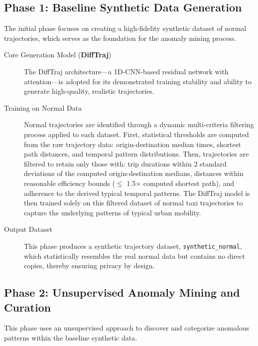 \subsection{Phase 1: Baseline Synthetic Data Generation}
\label{sec:baseline-generation}

The initial phase focuses on creating a high-fidelity synthetic dataset of normal trajectories, which serves as the foundation for the anomaly mining process.

\begin{description}
  \item[Core Generation Model (\textbf{DiffTraj})] The DiffTraj architecture---a 1D-CNN-based residual network with attention---is adopted for its demonstrated training stability and ability to generate high-quality, realistic trajectories.
  \item[Training on Normal Data] Normal trajectories are identified through a dynamic multi-criteria filtering process applied to each dataset. First, statistical thresholds are computed from the raw trajectory data: origin-destination median times, shortest path distances, and temporal pattern distributions. Then, trajectories are filtered to retain only those with: trip durations within 2 standard deviations of the computed origin-destination medians, distances within reasonable efficiency bounds ($\leq$ 1.5$\times$ computed shortest path), and adherence to the derived typical temporal patterns. The DiffTraj model is then trained solely on this filtered dataset of normal taxi trajectories to capture the underlying patterns of typical urban mobility.
  \item[Output Dataset] This phase produces a synthetic trajectory dataset, \texttt{synthetic\_normal}, which statistically resembles the real normal data but contains no direct copies, thereby ensuring privacy by design.
\end{description}

\subsection{Phase 2: Unsupervised Anomaly Mining and Curation}
\label{sec:anomaly-mining}

This phase uses an unsupervised approach to discover and categorize anomalous patterns within the baseline synthetic data.

